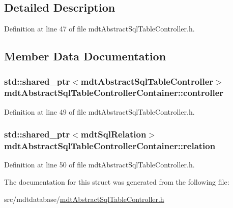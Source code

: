 \subsection{Detailed Description}


Definition at line 47 of file mdt\-Abstract\-Sql\-Table\-Controller.\-h.



\subsection{Member Data Documentation}
\hypertarget{structmdt_abstract_sql_table_controller_container_a78aed5460ebf7f78d18ac80bb855fa39}{
\subsubsection[{controller}]{\setlength{\rightskip}{0pt plus 5cm}std\-::shared\-\_\-ptr$<${\bf mdt\-Abstract\-Sql\-Table\-Controller}$>$ mdt\-Abstract\-Sql\-Table\-Controller\-Container\-::controller}}\label{structmdt_abstract_sql_table_controller_container_a78aed5460ebf7f78d18ac80bb855fa39}


Definition at line 49 of file mdt\-Abstract\-Sql\-Table\-Controller.\-h.

\hypertarget{structmdt_abstract_sql_table_controller_container_ac628635f902685e4c5c15f7cc2327af9}{
\subsubsection[{relation}]{\setlength{\rightskip}{0pt plus 5cm}std\-::shared\-\_\-ptr$<${\bf mdt\-Sql\-Relation}$>$ mdt\-Abstract\-Sql\-Table\-Controller\-Container\-::relation}}\label{structmdt_abstract_sql_table_controller_container_ac628635f902685e4c5c15f7cc2327af9}


Definition at line 50 of file mdt\-Abstract\-Sql\-Table\-Controller.\-h.



The documentation for this struct was generated from the following file\-:\begin{DoxyCompactItemize}
\item 
src/mdtdatabase/\hyperlink{mdt_abstract_sql_table_controller_8h}{mdt\-Abstract\-Sql\-Table\-Controller.\-h}\end{DoxyCompactItemize}
